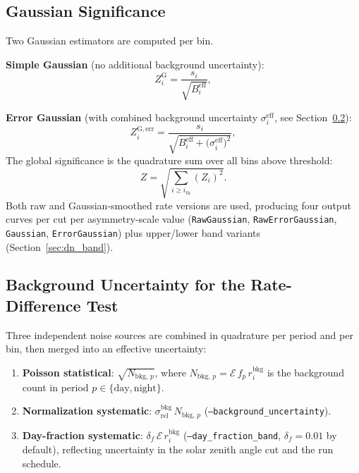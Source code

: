 \documentclass[12pt,a4paper]{article}
\newcommand{\Ecal}{\mathcal{E}}          %
\newcommand{\si}{s_{i}}                  %
\newcommand{\ZG}{Z^{\mathrm{G}}_{i}}
\newcommand{\ZGerr}{Z^{\mathrm{G,err}}_{i}}
\newcommand{\Beff}{B^{\mathrm{eff}}_{i}} %
\newcommand{\seff}{\sigma^{\mathrm{eff}}_{i}} %
\newcommand{\srel}{\sigma_{\mathrm{rel}}}
\begin{document}
\subsection{Gaussian Significance}
\label{sec:dn_gaussian}

Two Gaussian estimators are computed per bin.

\medskip
\noindent\textbf{Simple Gaussian} (no additional background uncertainty):
\begin{equation}
  \ZG = \frac{\si}{\sqrt{\Beff}},
  \label{eq:dn_simple_gaussian}
\end{equation}

\noindent\textbf{Error Gaussian}
(with combined background uncertainty $\seff$, see
Section~\ref{sec:dn_bkg_uncertainty}):
\begin{equation}
  \ZGerr = \frac{\si}{\sqrt{\Beff + \bigl(\seff\bigr)^2}},
  \label{eq:dn_error_gaussian}
\end{equation}
The global significance is the quadrature sum over all bins above threshold:
\begin{equation}
  Z = \sqrt{\sum_{i \ge i_{\mathrm{th}}} \!\left(Z_i\right)^2}.
  \label{eq:dn_global}
\end{equation}
Both raw and Gaussian-smoothed rate versions are used,
producing four output curves per cut per asymmetry-scale value
(\texttt{RawGaussian}, \texttt{RawErrorGaussian},
\texttt{Gaussian}, \texttt{ErrorGaussian})
plus upper/lower band variants (Section~\ref{sec:dn_band}).

\subsection{Background Uncertainty for the Rate-Difference Test}
\label{sec:dn_bkg_uncertainty}

Three independent noise sources are combined in quadrature per period and
per bin, then merged into an effective uncertainty:

\begin{enumerate}[leftmargin=*]
  \item \textbf{Poisson statistical}: $\sqrt{N_{\mathrm{bkg},\,p}}$,
    where $N_{\mathrm{bkg},\,p} = \Ecal\,f_p\,r_i^{\mathrm{bkg}}$ is the
    background count in period $p \in \{\mathrm{day, night}\}$.
  \item \textbf{Normalization systematic}:
    $\srel^{\mathrm{bkg}}\,N_{\mathrm{bkg},\,p}$
    (\texttt{--background\_uncertainty}).
  \item \textbf{Day-fraction systematic}:
    $\delta_f\,\Ecal\,r_i^{\mathrm{bkg}}$
    (\texttt{--day\_fraction\_band}, $\delta_f = 0.01$ by default),
    reflecting uncertainty in the solar zenith angle cut and the run schedule.
\end{enumerate}
\end{document}
